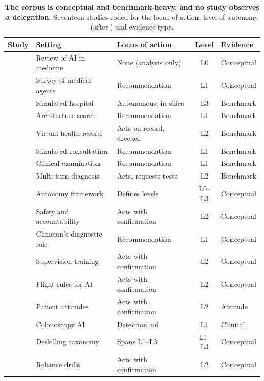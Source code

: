 \begin{table}[t]
\centering\footnotesize
\setlength{\tabcolsep}{4pt}
\begin{tabular}{@{}p{2.7cm}p{3.9cm}p{4.6cm}c p{2.1cm}@{}}
\toprule
Study & Setting & Locus of action & Level & Evidence \\
\midrule
\citet{topol2019}             & Review of AI in medicine   & None (analysis only)       & L0     & Conceptual \\
\citet{wang2025baymax}        & Survey of medical agents   & Recommendation             & L1     & Conceptual \\
\citet{li2024agenthospital}   & Simulated hospital         & Autonomous, in silico      & L3     & Benchmark  \\
\citet{zhuang2025learning}    & Architecture search        & Recommendation             & L1     & Benchmark  \\
\citet{jiang2025medagentbench}& Virtual health record      & Acts on record, checked    & L2     & Benchmark  \\
\citet{schmidgall2024agentclinic} & Simulated consultation  & Recommendation             & L1     & Benchmark  \\
\citet{gao2026medexagent}     & Clinical examination       & Recommendation             & L1     & Benchmark  \\
\citet{ma2026activemedagent}  & Multi-turn diagnosis       & Acts, requests tests       & L2     & Benchmark  \\
\citet{ye2025autonomy}        & Autonomy framework         & Defines levels             & L0--L3 & Conceptual \\
\citet{habli2020accountability} & Safety and accountability & Acts with confirmation   & L2     & Conceptual \\
\citet{clayton2025clinicians} & Clinician's diagnostic role & Recommendation            & L1     & Conceptual \\
\citet{abdulnour2025education}& Supervision training      & Acts with confirmation     & L2     & Conceptual \\
\citet{ong2026flight}         & Flight rules for AI        & Acts with confirmation     & L2     & Conceptual \\
\citet{busch2025attitudes}    & Patient attitudes          & Acts with confirmation     & L2     & Attitude   \\
\citet{budzyn2025deskilling}  & Colonoscopy AI             & Detection aid              & L1     & Clinical   \\
\citet{natali2025deskilling}  & Deskilling taxonomy        & Spans L1--L3               & L1--L3 & Conceptual \\
\citet{hunter2024reliance}    & Reliance drills            & Acts with confirmation     & L2     & Conceptual \\
\bottomrule
\end{tabular}
\caption{\textbf{The corpus is conceptual and benchmark-heavy, and no study observes a delegation.} Seventeen studies coded for the locus of action, level of autonomy (after \citealp{ye2025autonomy}) and evidence type.}
\label{tab:corpus}
\end{table}

